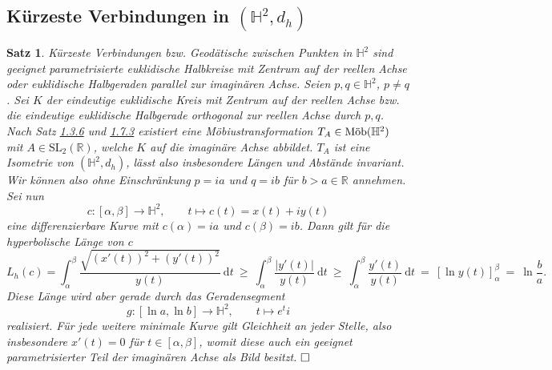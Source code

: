 \documentclass[11pt]{book}
\numberwithin{dummy}{section}
\newtheorem{theorem}{Satz}[section]
\theoremstyle{nonumberbreak}
\newenvironment{pr}[1][]{\ifthenelse{\equal{#1}{}}{\proof}{\proof[#1]}\rm}{\endproof}
\newcommand{\R}{\mathbb{R}}
\newcommand{\He}{\mathbb{H}}
\newcommand{\la}{\longrightarrow}
\newcommand{\amob}{\textup{Möb}}
\begin{document}
\begin{spacing}{1.4}
\section{Kürzeste Verbindungen in $(\He^2, d_h)$} %





\begin{theorem}
Kürzeste Verbindungen bzw. Geodätische zwischen Punkten in $\He^2$ sind geeignet parametrisierte euklidische Halbkreise mit Zentrum auf der reellen Achse oder euklidische Halbgeraden parallel zur imaginären Achse.
\begin{pr}
Seien $p,q \in \He^2$, $p\neq q$. Sei $K$ der eindeutige euklidische Kreis mit Zentrum auf der reellen Achse bzw. die eindeutige euklidische Halbgerade orthogonal zur reellen Achse durch $p,q$. Nach Satz \hyperlink{satzeinsdreisechs}{1.3.6} und \hyperlink{satzeinssiebendrei}{1.7.3} existiert eine Möbiustransformation $T_A \in \amob(\He^2)$ mit $A \in \mathrm{SL}_2(\R)$, welche $K$ auf die imaginäre Achse abbildet. $T_A$ ist eine Isometrie von $(\He^2, d_h)$, lässt also insbesondere Längen und Abstände invariant. Wir können also ohne Einschränkung $p=ia$ und $q=ib$ für $b>a \in \R$ annehmen. Sei nun $$c:[\alpha,\beta] \la \He^2, \qquad t \mapsto c(t) = x(t) + i y(t)$$ eine differenzierbare Kurve mit $c(\alpha)=ia$ und $c(\beta)=ib$. Dann gilt für die hyperbolische Länge von $c$
$$L_h(c) = \int_{\alpha}^{\beta} \frac{\sqrt{ (x'(t))^2 + (y'(t))^2}}{y(t)} \ \mathrm{d}t \ \geqslant\ \int_{\alpha}^{\beta} \frac{\vert y'(t)\vert}{y(t)} \ \mathrm{d} t \ \geqslant \ \int_{\alpha}^{\beta} \frac{y'(t)}{y(t)} \ \mathrm{d}t \ =\ \left[ \ln y(t)\right]^{\beta}_{\alpha} \ =\ \ln \frac{b}{a}.$$
Diese Länge wird aber gerade durch das Geradensegment
$$g: [\ln a,\ln b] \la \He^2, \qquad t \mapsto e^{t}i$$
realisiert. Für jede weitere minimale Kurve gilt Gleichheit an jeder Stelle, also insbesondere $x'(t) = 0$ für $t \in [\alpha, \beta]$, womit diese auch ein geeignet parametrisierter Teil der imaginären Achse als Bild besitzt. $\hfill \Box$

\end{pr}
\end{theorem}



\end{spacing}
\end{document}

